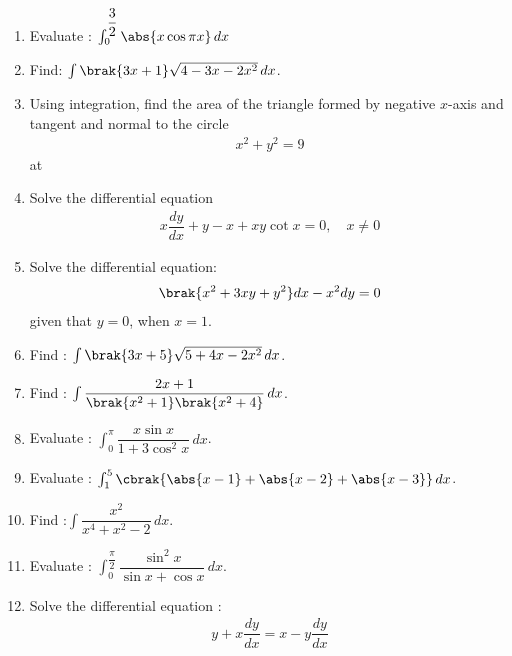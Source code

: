 \begin{enumerate}
    \item Evaluate : $\int_{0}^{\dfrac{3}{2}} \abs{x \cos \pi x}\,dx$
    \item Find: $\int \brak{3x +1}\sqrt{4-3x-2x^2} \,dx$.
    \item Using integration, find the area of the triangle formed by negative $x$-axis and tangent and normal to the circle
          \begin{align*}
              x^2 + y^2 =9
          \end{align*}
          at 
    \item Solve the differential equation
          \begin{align*}
              x\dfrac{dy}{dx} +y -x +xy \cot x= 0, \quad x\neq 0
          \end{align*}
    \item Solve the differential equation:
          \begin{align*}
              \brak{x^2+3xy+y^2}dx -x^2dy = 0
          \end{align*}
          given that $y=0$, when $x=1$.
    \item Find : $\int \brak{3x+5}\sqrt{5+4x-2x^2}\,dx$.
    \item Find : $\int \dfrac{2x+1}{\brak{x^2+1}\brak{x^2+4}}\,dx$.
    \item Evaluate : $\int_{0}^{\pi}\dfrac{x\sin x}{1+3\cos^2 x}\,dx$.
    \item Evaluate : $\int_{1}^{5}\cbrak{\abs{x-1}+\abs{x-2}+\abs{x-3}}\,dx$.
    \item Find :$\int \dfrac{x^2}{x^4 + x^2 -2}\,dx$.
    \item Evaluate : $\int_{0}^{\dfrac{\pi}{2}} \dfrac{\sin^2 x}{\sin x + \cos x} \,dx$.
    \item Solve the differential equation :
          \begin{align*}
              y+ x\dfrac{dy}{dx} = x-y\dfrac{dy}{dx}
          \end{align*}
\end{enumerate}